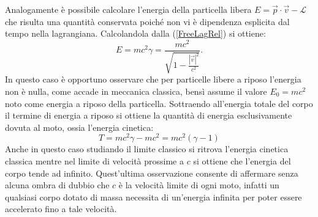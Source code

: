 Analogamente è possibile calcolare l'energia della particella libera $E = \vec{p}\cdot\vec{v}-\mathcal{L} $ che risulta una quantità conservata poiché non vi è dipendenza esplicita dal tempo nella lagrangiana. Calcolandola dalla (\ref{FreeLagRel}) si ottiene:
\begin{equation}
    E = mc^2\gamma=\frac{mc^2}{\sqrt{1-\frac{|\vec{v}|^2}{c^2}}}.\label{energiaRel}
\end{equation}
In questo caso è opportuno osservare che per particelle libere a riposo l'energia non è nulla, come accade in meccanica classica, bensì assume il valore $E_0=mc^2$ noto come energia a riposo della particella. Sottraendo all'energia totale del corpo il termine di energia a riposo si ottiene la quantità di energia esclusivamente dovuta al moto, ossia l'energia cinetica:
\begin{equation}
    T=mc^2\gamma-mc^2=mc^2(\gamma-1)
\end{equation}
Anche in questo caso studiando il limite classico si ritrova l'energia cinetica classica mentre nel limite di velocità prossime a $c$ si ottiene che l'energia del corpo tende ad infinito. Quest'ultima osservazione consente di affermare senza alcuna ombra di dubbio che $c$ è la velocità limite di ogni moto, infatti un qualsiasi corpo dotato di massa necessita di un'energia infinita per poter essere accelerato fino a tale velocità.\\

